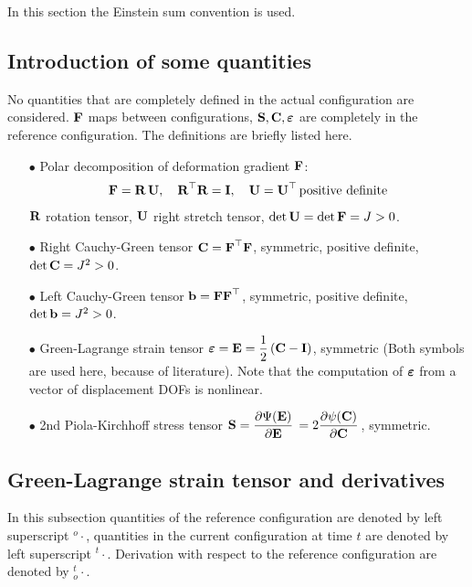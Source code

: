 In this section the Einstein sum convention is used.

\subsection{Introduction of some quantities}
No quantities that are completely defined in the actual configuration are considered. $\textbf{F}$ maps between configurations, $\textbf{S}, \textbf{C}, \boldsymbol{\varepsilon}$ are completely in the reference configuration.
The definitions are briefly listed here.
\begin{itemize}
\item[$\bullet$] Polar decomposition of deformation gradient $\textbf{F}$:
\begin{equation*}
  \begin{array}{lll}
    \textbf{F} = \textbf{R}\,\textbf{U}, \quad \textbf{R}^\top\textbf{R} = \textbf{I}, \quad \textbf{U} = \textbf{U}^\top \,\text{positive definite}
  \end{array}
\end{equation*}
$\textbf{R}$ rotation tensor, $\textbf{U}$ right stretch tensor, $\hbox{det} \, \textbf{U} = \hbox{det} \, \textbf{F} = J > 0$.
%
\item[$\bullet$] Right Cauchy-Green tensor $\textbf{C} = \textbf{F}^\top \textbf{F}$, symmetric, positive definite, $\hbox{det} \, \textbf{C} = J^2 > 0$.
\item[$\bullet$] Left Cauchy-Green tensor $\textbf{b} = \textbf{F}\textbf{F}^\top$, symmetric, positive definite, $\hbox{det} \, \textbf{b} = J^2 > 0$.
\item[$\bullet$] Green-Lagrange strain tensor $\boldsymbol{\varepsilon} = \textbf{E} =\displaystyle\frac{\displaystyle{1}}{\displaystyle{2}}\,(\textbf{C} - \textbf{I})$, symmetric (Both symbols are used here, because of literature). Note that the computation of $\boldsymbol{\varepsilon}$ from a vector of displacement DOFs is nonlinear.
\item[$\bullet$] 2nd Piola-Kirchhoff stress tensor $\bfS = \p{\Psi(\bfE)}{\bfE} = 2\p{\psi(\bfC)}{\bfC}$, symmetric.
\end{itemize}

\subsection{Green-Lagrange strain tensor and derivatives}

In this subsection quantities of the reference configuration are denoted by left superscript ${}^o{\cdot}$, quantities in the current configuration at time $t$ are denoted by left superscript ${}^t{\cdot}$. Derivation with respect to the reference configuration are denoted by ${}^{t}_o{\cdot}$.


